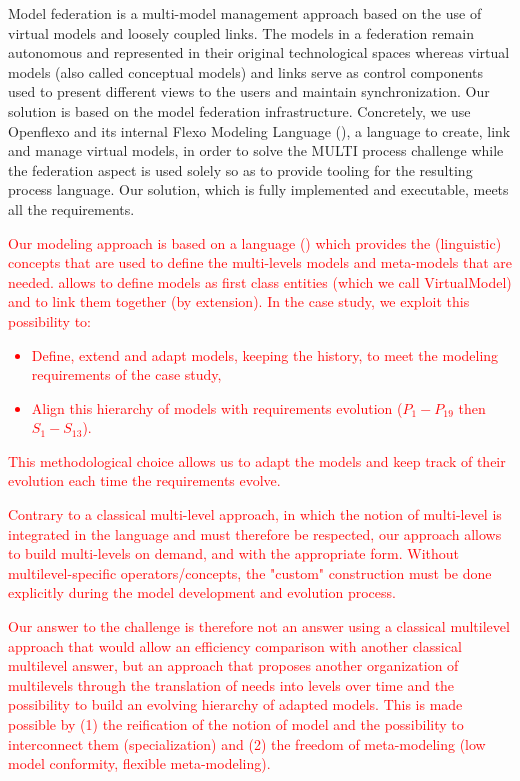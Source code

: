 Model federation is a multi-model management approach based on the use of virtual models and loosely coupled links. The models in a federation remain autonomous and represented in their original technological spaces whereas virtual models (also called conceptual models) and links serve as control components used to present different views to the users and maintain synchronization.
Our solution is based on the model federation infrastructure. Concretely, we use Openflexo and its internal Flexo Modeling Language (\FML), a language to create, link and manage virtual models, in order to solve the MULTI process challenge while the federation aspect is used solely so as to provide tooling for the resulting process language. Our solution, which is fully implemented and executable, meets all the requirements.

\textcolor{red}{Our modeling approach is based on a language (\FML) which provides the (linguistic) concepts that are used to define  the multi-levels models and meta-models that are needed. \FML allows to define models as first class entities (which we call VirtualModel) and to link them together (by extension). In the \mpc case study, we exploit this possibility to:
\begin{itemize}
    \item Define, extend and adapt models, keeping the history, to meet {\color{blue}the} %
    modeling requirements of the case study,
    \item Align this hierarchy of models with requirements evolution ($P_1-P_{19}$ then $S_1-S_{13}$).
\end{itemize}
This methodological choice allows us to adapt the models and keep track of their evolution each time the requirements evolve.}

\textcolor{red}{Contrary to a classical multi-level approach, in which the notion of multi-level is integrated in the language and must therefore be respected, our approach allows to build multi-levels on demand, and with the appropriate form. Without multilevel-specific operators/concepts, the "custom" construction must be done explicitly during the model development and evolution process.}

\textcolor{red}{Our answer to the challenge is therefore not an answer using a classical multilevel approach that would allow an efficiency comparison with another classical multilevel answer, but an approach that proposes another organization of multilevels through the translation of needs into levels over time and the possibility to build an evolving hierarchy of adapted models. This is made possible by (1) the reification of the notion of model and the possibility to interconnect them (specialization) and (2) the freedom of meta-modeling (low model conformity, flexible meta-modeling).}

